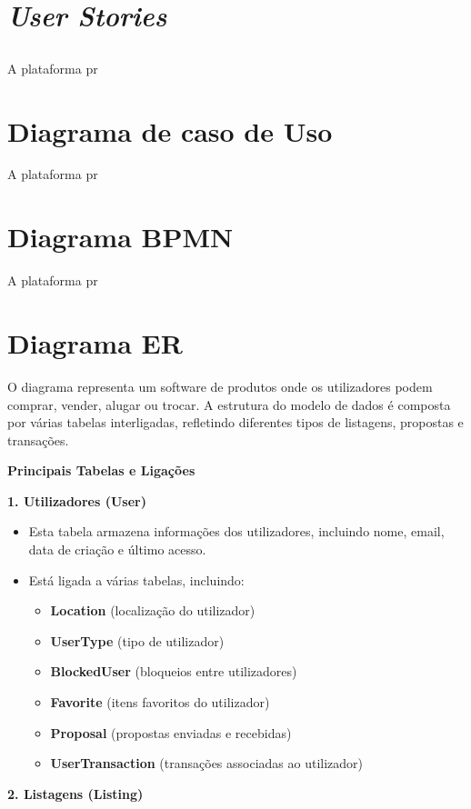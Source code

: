 \documentclass[a4paper, 12pt]{article} %
\begin{document}
\newpage
\section*{\textit{User Stories}}
\subsection{}
A plataforma pr

\newpage
\section*{Diagrama de caso de Uso}

A plataforma pr
\newpage
\section*{Diagrama BPMN}

A plataforma pr


\newpage
\section*{Diagrama ER}

O diagrama representa um software de produtos onde os utilizadores podem comprar, vender, alugar ou trocar. A estrutura do modelo de dados é composta por várias tabelas interligadas, refletindo diferentes tipos de listagens, propostas e transações.

\textbf{Principais Tabelas e Ligações}

\textbf{1. Utilizadores (User)}

\begin{itemize}
    \item Esta tabela armazena informações dos utilizadores, incluindo nome, email, data de criação e último acesso.
    \item Está ligada a várias tabelas, incluindo:
    \begin{itemize}
        \item \textbf{Location} (localização do utilizador)
        \item \textbf{UserType} (tipo de utilizador)
        \item \textbf{BlockedUser} (bloqueios entre utilizadores)
        \item \textbf{Favorite} (itens favoritos do utilizador)
        \item \textbf{Proposal} (propostas enviadas e recebidas)
        \item \textbf{UserTransaction} (transações associadas ao utilizador)
    \end{itemize}
\end{itemize}
\textbf{2. Listagens (Listing)}
\end{document}
